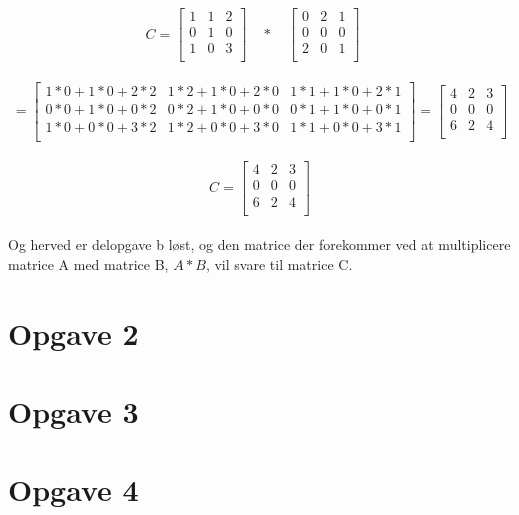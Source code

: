 \documentclass[20pt]{article}
\begin{document}
	\begin{equation}
		C = 
		\begin{bmatrix} 
			1 & 1 & 2 \\
			0 & 1 & 0 \\
			1 & 0 & 3 \\
		\end{bmatrix}
		\quad * \quad
		\begin{bmatrix} 
			0 & 2 & 1 \\
			0 & 0 & 0 \\
			2 & 0 & 1 \\
		\end{bmatrix}
		\quad	
	\end{equation}
	\\ 
	\begin{equation}
		= 
		\begin{bmatrix} 
			1*0+1*0+2*2 & 1*2+1*0+2*0 & 1*1+1*0+2*1 \\
			0*0+1*0+0*2 & 0*2+1*0+0*0 & 0*1+1*0+0*1 \\
			1*0+0*0+3*2 & 1*2+0*0+3*0 & 1*1+0*0+3*1 \\
		\end{bmatrix}
		= 
		\begin{bmatrix} 
			4 & 2 & 3 \\
			0 & 0 & 0 \\
			6 & 2 & 4 \\
		\end{bmatrix}
	\end{equation}
	\\
	\begin{equation}
		C = 
		\begin{bmatrix} 
			4 & 2 & 3 \\
			0 & 0 & 0 \\
			6 & 2 & 4 \\
		\end{bmatrix}
	\end{equation}
	\\
	Og herved er delopgave b løst, og den matrice der forekommer ved at multiplicere matrice A med matrice B, \(A*B\), vil svare til matrice C.
	\newpage
		
	\section*{Opgave 2}
	
	
	
	\section*{Opgave 3}
	
	
	
	\section*{Opgave 4}
	

	
	
	
	
\end{document}
